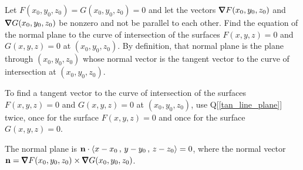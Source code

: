 \begin{question}
Let $F(x_0,y_0,z_0)=G(x_0,y_0,z_0)=0$ and let the vectors
$\vnabla F(x_0,y_0,z_0)$ and $\vnabla G(x_0,y_0,z_0)$ be nonzero and not
be parallel to each other. Find the equation of the normal plane to the 
curve of intersection of the surfaces $F(x,y,z)=0$ and $G(x,y,z)=0$ at
$(x_0,y_0,z_0)$. By definition, that normal plane is the plane through
$(x_0,y_0,z_0)$ whose normal vector is the tangent vector to the curve of
intersection at $(x_0,y_0,z_0)$. 
\end{question}

\begin{hint}
To find a tangent vector to the curve of intersection of the 
surfaces $F(x,y,z)=0$ and $G(x,y,z)=0$ at $(x_0,y_0,z_0)$,
use Q[\ref{tan_line_plane}] twice, once for the surface $F(x,y,z)=0$ and
once for the surface $G(x,y,z)=0$.
\end{hint}

\begin{answer}
The normal plane is $\mathbf{n}\cdot\left< x-x_0\,,\,y-y_0\,,\,z-z_0\right> =0$,
where the normal vector 
$\vn = \vnabla F(x_0,y_0,z_0)\times \vnabla G(x_0,y_0,z_0)$.
\end{answer}

